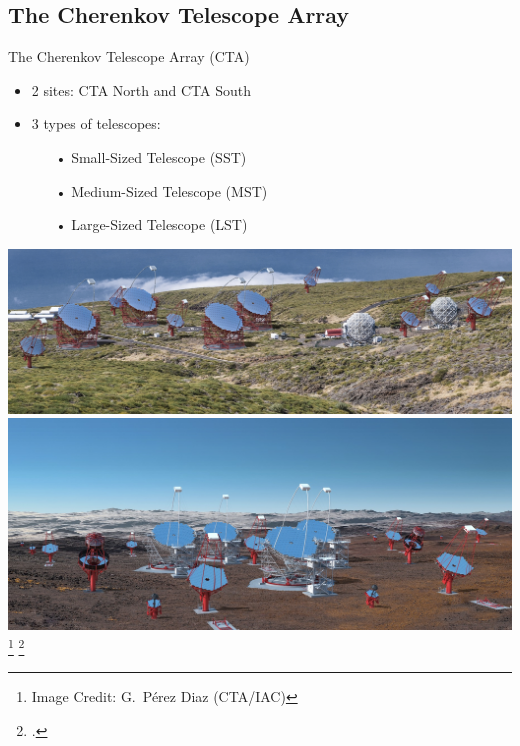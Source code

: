 \subsection{The Cherenkov Telescope Array}

\begin{frame}{The Cherenkov Telescope Array (CTA)}
  \begin{minipage}{0.48\textwidth}
    \begin{itemize}
      \setlength\itemsep{1em}
      \item 2 sites: CTA North and CTA South
      \item 3 types of telescopes:
      \begin{itemize}
        \setlength\itemsep{0.5em}
        \item [•] Small-Sized Telescope (SST)
        \item [•] Medium-Sized Telescope (MST)
        \item [•] Large-Sized Telescope (LST)
      \end{itemize}
    \end{itemize}
  \end{minipage}
  \begin{minipage}{0.48\textwidth}
    \begin{center}
      \includegraphics[width=\textwidth]{graphics/cta_north_render.jpg}
      \includegraphics[width=\textwidth]{graphics/cta_south_render.jpg}
      \ifdefined\darktheme
        \footnote{\textcolor{white!85!black}{Image Credit: G.~Pérez Diaz (CTA/IAC)}}
      \else
        \footcite[\textcolor{darkgray!85!black}{Image Credit:}][]{perezdiaz}
      \fi
    \end{center}
  \end{minipage}
\end{frame}


